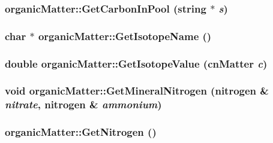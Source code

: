 \label{classorganic_matter_a61c294edd237e70d07a33678a470f1dc}
\hypertarget{classorganic_matter_aaa2442182b092b20547ea3cc422000de}{
\subsubsection[{GetCarbonInPool}]{ organicMatter::GetCarbonInPool (string $\ast$ {\em s})}}
\label{classorganic_matter_aaa2442182b092b20547ea3cc422000de}
\hypertarget{classorganic_matter_a87f6c16bf53e782fd3be862f2acc40ae}{
\subsubsection[{GetIsotopeName}]{\setlength{\rightskip}{0pt plus 5cm}char $\ast$ organicMatter::GetIsotopeName ()}}
\label{classorganic_matter_a87f6c16bf53e782fd3be862f2acc40ae}
\hypertarget{classorganic_matter_a61d7bd102ae877658b15b6e186b4b250}{
\subsubsection[{GetIsotopeValue}]{\setlength{\rightskip}{0pt plus 5cm}double organicMatter::GetIsotopeValue ({\bf cnMatter} {\em c})}}
\label{classorganic_matter_a61d7bd102ae877658b15b6e186b4b250}
\hypertarget{classorganic_matter_a08fafc2497f2ef975d24ed944a7fe39d}{
\subsubsection[{GetMineralNitrogen}]{\setlength{\rightskip}{0pt plus 5cm}void organicMatter::GetMineralNitrogen ({\bf nitrogen} \& {\em nitrate}, \/  {\bf nitrogen} \& {\em ammonium})}}
\label{classorganic_matter_a08fafc2497f2ef975d24ed944a7fe39d}
\hypertarget{classorganic_matter_a719b504d46e267423e58c37d1c1bc058}{
\subsubsection[{GetNitrogen}]{ organicMatter::GetNitrogen ()}}
